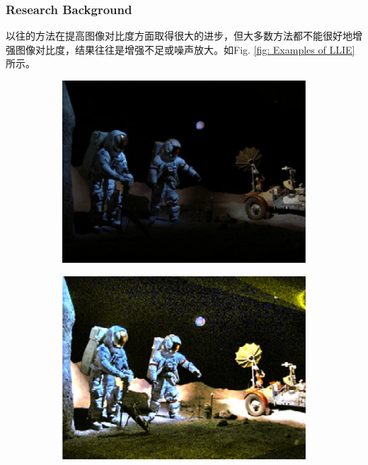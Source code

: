 \documentclass[letterpaper,10pt]{article}
\begin{document}
			\subsubsection{Research Background}
				
			以往的方法在提高图像对比度方面取得很大的进步，但大多数方法都不能很好地增强图像对比度，结果往往是增强不足或噪声放大。如Fig. \ref{fig: Examples of LLIE}所示。
				
			\begin{figure}[htbp] 
				\centering 
				
				\begin{subfigure}{0.24\textwidth}
					\includegraphics[width=\linewidth]{picture/LLIE/Input1}
					\captionsetup{font=scriptsize}
					\label{fig: Input1}
				\end{subfigure}
				\begin{subfigure}{0.24\textwidth}
					\includegraphics[width=\linewidth]{picture/LLIE/LLME1}

\end{subfigure}
\end{figure}
\end{document}
